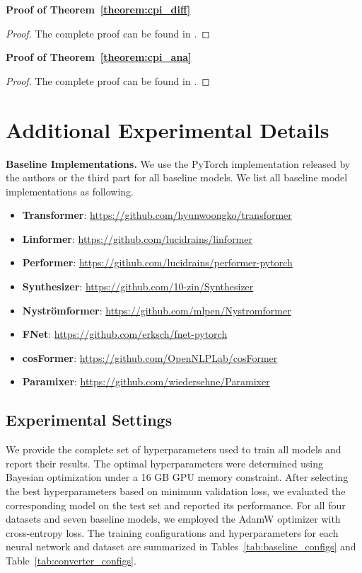 \noindent\textbf{Proof of Theorem~\ref{theorem:cpi_diff}}
\begin{proof}
The complete proof can be found in \citet{10.1137/1.9781611975949}.
\end{proof}

\noindent\textbf{Proof of Theorem~\ref{theorem:cpi_ana}}
\begin{proof}
The complete proof can be found in \citet{10.1137/1.9781611975949}.
\end{proof}

\section{Additional Experimental Details}
\noindent\textbf{Baseline Implementations.} We use the PyTorch implementation released by the authors or the third part for all baseline models. We list all baseline model implementations as following.
\begin{itemize}
\item \textbf{Transformer}: \href{https://github.com/hyunwoongko/transformer}{https://github.com/hyunwoongko/transformer}
\item \textbf{Linformer}: \href{https://github.com/lucidrains/linformer}{https://github.com/lucidrains/linformer}
\item \textbf{Performer}: \href{https://github.com/lucidrains/performer-pytorch}{https://github.com/lucidrains/performer-pytorch}
\item \textbf{Synthesizer}: \href{https://github.com/10-zin/Synthesizer}{https://github.com/10-zin/Synthesizer}
\item \textbf{Nystr{\"{o}}mformer}: \href{https://github.com/mlpen/Nystromformer}{https://github.com/mlpen/Nystromformer}
\item \textbf{FNet}: \href{https://github.com/erksch/fnet-pytorch}{https://github.com/erksch/fnet-pytorch}
\item \textbf{cosFormer}: \href{https://github.com/OpenNLPLab/cosFormer}{https://github.com/OpenNLPLab/cosFormer}
\item \textbf{Paramixer}: \href{https://github.com/wiedersehne/Paramixer}{https://github.com/wiedersehne/Paramixer}
\end{itemize}

\subsection{Experimental Settings}
We provide the complete set of hyperparameters used to train all models and report their results. The optimal hyperparameters were determined using Bayesian optimization under a 16 GB GPU memory constraint. After selecting the best hyperparameters based on minimum validation loss, we evaluated the corresponding model on the test set and reported its performance. For all four datasets and seven baseline models, we employed the AdamW optimizer with cross-entropy loss. The training configurations and hyperparameters for each neural network and dataset are summarized in Tables~\ref{tab:baseline_configs} and Table~\ref{tab:converter_configs}.

